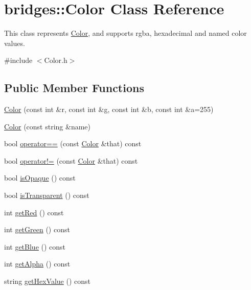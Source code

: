 \hypertarget{classbridges_1_1_color}{}\section{bridges\+:\+:Color Class Reference}
\label{classbridges_1_1_color}


This class represents \hyperlink{classbridges_1_1_color}{Color}, and supports rgba, hexadecimal and named color values.  




{\ttfamily \#include $<$Color.\+h$>$}

\subsection*{Public Member Functions}
\begin{DoxyCompactItemize}
\item 
\hyperlink{classbridges_1_1_color_aa861c0dc7729008cc4f886f235198181}{Color} (const int \&r, const int \&g, const int \&b, const int \&a=255)
\item 
\hyperlink{classbridges_1_1_color_a813c6cb59aad0883bcc12305fa6049cc}{Color} (const string \&name)
\item 
bool \hyperlink{classbridges_1_1_color_a9b33b4ee063496691f8816504cc8b007}{operator==} (const \hyperlink{classbridges_1_1_color}{Color} \&that) const
\item 
bool \hyperlink{classbridges_1_1_color_abe4ff1e5d4c6a33b2e9715be57ae0dce}{operator!=} (const \hyperlink{classbridges_1_1_color}{Color} \&that) const
\item 
bool \hyperlink{classbridges_1_1_color_ae55f3077cb3bd93386dc11eaeecf823c}{is\+Opaque} () const
\item 
bool \hyperlink{classbridges_1_1_color_a56b0d17239aafa0cea7f43e5358cf4c0}{is\+Transparent} () const
\item 
int \hyperlink{classbridges_1_1_color_a4c81e33854a6fdba9a3030e97ec8609e}{get\+Red} () const
\item 
int \hyperlink{classbridges_1_1_color_a93f8e016e1f1e6c177924ad8712e3e48}{get\+Green} () const
\item 
int \hyperlink{classbridges_1_1_color_aa7a70279f41f2cceb640162c43a2a382}{get\+Blue} () const
\item 
int \hyperlink{classbridges_1_1_color_a61523716f5597013d57bc98eae1fe96a}{get\+Alpha} () const
\item 
string \hyperlink{classbridges_1_1_color_a051fa9e828ce7025093c65c46358a8cf}{get\+Hex\+Value} () const

\end{DoxyCompactItemize}
